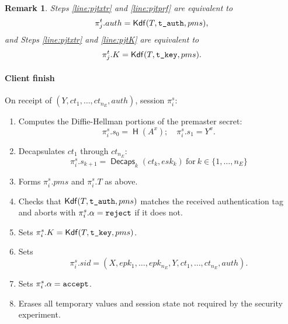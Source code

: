\documentclass[USenglish,oneside,twocolumn]{article}
\theoremstyle{dgthm}
\theoremstyle{dgdef}
\newtheorem{remark}[theorem]{Remark}
\newcommand{\AlgorithmName}[1]{\operatorname{\mathsf{#1}}}
\newcommand{\Hash}{\AlgorithmName{H}}
\newcommand{\Decaps}{\AlgorithmName{Decaps}}
\newcommand{\KDF}{\AlgorithmName{Kdf}}
\newcommand{\p}[2]{\pi_{#1}^{#2}}
\newcommand{\Token}[1]{\textnormal{\tt{#1}}}
\newcommand{\reject}{\Token{reject}}
\newcommand{\accept}{\Token{accept}}
\begin{document}
  \begin{remark}
    Steps \ref{line:pjtxtr} and \ref{line:pjtprf} are equivalent to
      \[\p{j}{t}.auth = \KDF(T, \Token{t\_auth}, pms),\]
  and Steps \ref{line:pjtxtr} and \ref{line:pjtK} are equivalent to
      \[\p{j}{t}.K = \KDF(T, \Token{t\_key}, pms).\]
  \end{remark}

  \paragraph*{Client finish}
  On receipt of $(Y, ct_1, \dots, ct_{n_E}, auth)$, session $\p{i}{s}$:
  \begin{enumerate}
    \item Computes the Diffie-Hellman portions of the premaster secret:
      \[\p{i}{s}.s_0 = \Hash(A^x); \quad \p{i}{s}.s_1 = Y^x.\]
    \item Decapsulates $ct_1$ through $ct_{n_E}$:
      \[\p{i}{s}.s_{k+1} = \Decaps_k(ct_k, esk_k) \mathrm{~for~} k \in \{1, \dots, n_E\}\]
    \item Forms $\p{i}{s}.pms$ and $\p{i}{s}.T$ as above.
    \item Checks that $\KDF(T, \Token{t\_auth}, pms)$ matches the received
      authentication tag and aborts with $\p{i}{s}.\alpha = \reject$ if it does not.
    \item Sets $\p{i}{s}.K = \KDF(T, \Token{t\_key}, pms)$.
    \item Sets \[\p{i}{s}.sid = (X, epk_1, \dots, epk_{n_E}, Y, ct_1, \dots, ct_{n_E}, auth).\]
    \item Sets $\p{i}{s}.\alpha = \accept$.
    \item Erases all temporary values and session state not required by the security experiment.
  \end{enumerate}
\end{document}
